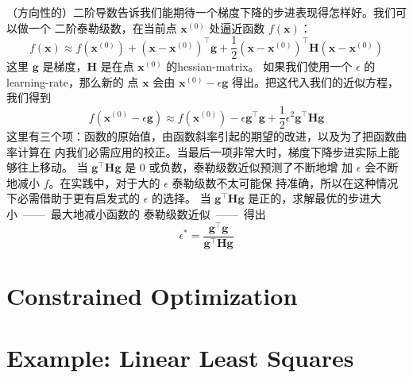 （方向性的）二阶导数告诉我们能期待一个梯度下降的步进表现得怎样好。我们可以做一个
二阶泰勒级数，在当前点 $\pmb{x}^{(0)}$ 处逼近函数 $f(\pmb{x})$：
\begin{equation}
  f(\pmb{x}) \approx f(\pmb{x}^{(0)}) + (\pmb{x} - \pmb{x}^{(0)})^{\top}\pmb{g} + \frac{1}{2}(\pmb{x} - \pmb{x}^{(0)})^{\top}\pmb{H}(\pmb{x} - \pmb{x}^{(0)})
\end{equation}
这里 $\pmb{g}$ 是梯度，$\pmb{H}$ 是在点 $\pmb{x}^{(0)}$ 的\gls*{hessian-matrix}。
如果我们使用一个 $\epsilon$ 的\gls*{learning-rate}，那么新的
点 $\pmb{x}$ 会由 $\pmb{x}^{(0)} - \epsilon\pmb{g}$ 得出。把这代入我们的近似方程，
我们得到
\begin{equation}
  f(\pmb{x}^{(0)} - \epsilon\pmb{g}) \approx f(\pmb{x}^{(0)}) - \epsilon\pmb{g}^{\top}\pmb{g} + \frac{1}{2}\epsilon^2\pmb{g}^{\top}\pmb{H}\pmb{g}
\end{equation}
这里有三个项：函数的原始值，由函数斜率引起的期望的改进，以及为了把函数曲率计算在
内我们必需应用的校正。当最后一项非常大时，梯度下降步进实际上能够往上移动。
当 $\pmb{g}^{\top}\pmb{H}\pmb{g}$ 是 $0$ 或负数，泰勒级数近似预测了不断地增
加 $\epsilon$ 会不断地减小 $f$。在实践中，对于大的 $\epsilon$ 泰勒级数不太可能保
持准确，所以在这种情况下必需借助于更有启发式的 $\epsilon$ 的选择。
当 $\pmb{g}^{\top}\pmb{H}\pmb{g}$ 是正的，求解最优的步进大小~——~最大地减小函数的
泰勒级数近似~——~得出
\begin{equation}
  \epsilon^* = \frac{\pmb{g}^{\top}\pmb{g}}{\pmb{g}^{\top}\pmb{H}\pmb{g}}
\end{equation}

\section{Constrained Optimization}
\label{sec:constrained_optimization}

\section{Example: Linear Least Squares}
\label{sec:example:linear_least_squares}
